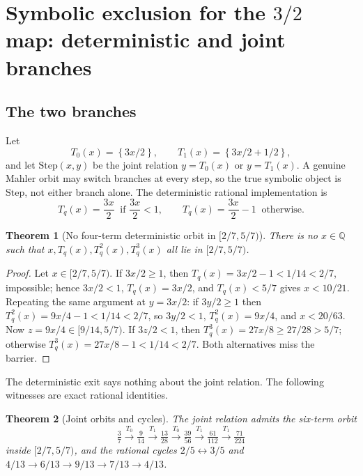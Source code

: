 \documentclass[11pt,a4paper]{article}
\newtheorem{theorem}{Theorem}[section]
\theoremstyle{remark}
\newcommand{\Q}{\mathbb{Q}}
\newcommand{\fract}[1]{\left\{#1\right\}}
\begin{document}
\section{Symbolic exclusion for the \texorpdfstring{$3/2$}{3/2} map: deterministic and joint branches}
\label{sec:threehalves}

\subsection{The two branches}

Let
\[
  T_{0}(x) = \fract{3x/2}, \qquad T_{1}(x) = \fract{3x/2 + 1/2},
\]
and let $\mathrm{Step}(x,y)$ be the joint relation $y = T_{0}(x)$ or $y = T_{1}(x)$. A genuine Mahler orbit may switch branches at every step, so the true symbolic object is $\mathrm{Step}$, not either branch alone. The deterministic rational implementation is
\[
  T_{q}(x) = \frac{3x}{2} \ \text{ if } \frac{3x}{2} < 1, \qquad T_{q}(x) = \frac{3x}{2} - 1 \ \text{ otherwise.}
\]

\begin{theorem}[No four-term deterministic orbit in $[2/7,5/7)$]
\label{thm:exit}
There is no $x \in \Q$ such that $x, T_{q}(x), T_{q}^{2}(x), T_{q}^{3}(x)$ all lie in $[2/7,5/7)$.
\end{theorem}

\begin{proof}
Let $x \in [2/7,5/7)$. If $3x/2 \ge 1$, then $T_{q}(x) = 3x/2 - 1 < 1/14 < 2/7$, impossible; hence $3x/2 < 1$, $T_{q}(x) = 3x/2$, and $T_{q}(x) < 5/7$ gives $x < 10/21$. Repeating the same argument at $y = 3x/2$: if $3y/2 \ge 1$ then $T_{q}^{2}(x) = 9x/4 - 1 < 1/14 < 2/7$, so $3y/2 < 1$, $T_{q}^{2}(x) = 9x/4$, and $x < 20/63$. Now $z = 9x/4 \in [9/14,5/7)$. If $3z/2 < 1$, then $T_{q}^{3}(x) = 27x/8 \ge 27/28 > 5/7$; otherwise $T_{q}^{3}(x) = 27x/8 - 1 < 1/14 < 2/7$. Both alternatives miss the barrier.
\end{proof}

The deterministic exit says nothing about the joint relation. The following witnesses are exact rational identities.

\begin{theorem}[Joint orbits and cycles]
\label{thm:joint}
The joint relation admits the six-term orbit
\[
  \tfrac37 \xrightarrow{T_{0}} \tfrac9{14} \xrightarrow{T_{1}} \tfrac{13}{28}
  \xrightarrow{T_{0}} \tfrac{39}{56} \xrightarrow{T_{1}} \tfrac{61}{112}
  \xrightarrow{T_{1}} \tfrac{71}{224}
\]
inside $[2/7,5/7)$, and the rational cycles $2/5 \leftrightarrow 3/5$ and $4/13 \to 6/13 \to 9/13 \to 7/13 \to 4/13$.
\end{theorem}
\end{document}
